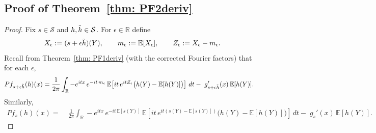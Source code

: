 \documentclass[12pt,leqno]{amsart}
\begin{document}
\subsection{Proof of Theorem~\ref{thm: PF2deriv}}
\begin{proof}
Fix $s\in\mathcal{S}$ and $h,\Tilde h\in\mathcal{S}$. For $\epsilon\in\mathbb R$ define
\[
X_\epsilon := (s+\epsilon\Tilde h)(Y),\qquad m_\epsilon:=\mathbb E[X_\epsilon],\qquad
Z_\epsilon := X_\epsilon-m_\epsilon.
\]
Recall from Theorem~\ref{thm: PF1deriv} (with the corrected Fourier factors) that for each $\epsilon$,
\begin{align}\label{eq:Pf_first_var_eps_pf2}
Pf_{s+\epsilon\Tilde h}(h)(x)
=&\;\frac{1}{2\pi}\int_{\mathbb R}-e^{itx}\,e^{-it\,m_\epsilon}\,
\mathbb E\!\left[
it\,e^{itZ_\epsilon}\big(h(Y)-\mathbb E[h(Y)]\big)
\right]\,dt
-\;g_{s+\epsilon\Tilde h}'(x)\,\mathbb E[h(Y)].
\end{align}
Similarly,
\begin{align}\label{eq:Pf_first_var_0_pf2}
Pf_{s}(h)(x)
=&\;\frac{1}{2\pi}\int_{\mathbb R}-e^{itx}\,e^{-it\,\mathbb E[s(Y)]}\,
\mathbb E\!\left[
it\,e^{it(s(Y)-\mathbb E[s(Y)])}\big(h(Y)-\mathbb E[h(Y)]\big)
\right]\,dt
-\;g_{s}'(x)\,\mathbb E[h(Y)].
\end{align}


\end{proof}
\end{document}

